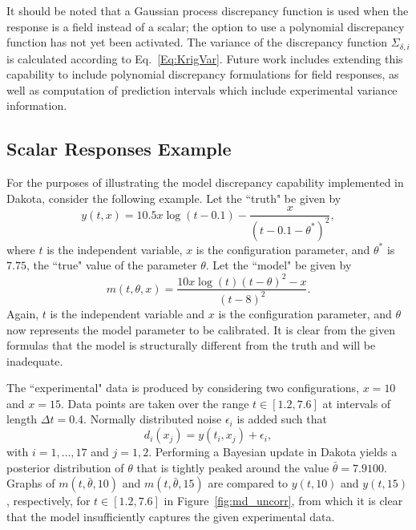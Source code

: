 It should be noted that a Gaussian process discrepancy function is used when 
the response is a field instead of a scalar; the option to use a polynomial
discrepancy function has not yet been activated. The variance of the
discrepancy function $\Sigma_{\delta, i}$ is calculated according to 
Eq.~\ref{Eq:KrigVar}. Future work includes extending this capability to 
include polynomial discrepancy formulations for field responses, as well as 
computation of prediction intervals which include experimental variance 
information.



\subsection{Scalar Responses Example}

For the purposes of illustrating the model discrepancy capability implemented
in Dakota, consider the following example. Let the ``truth" be given by
\begin{equation}\label{eq:md_truth}
y(t,x) = 10.5 x \log(t-0.1) - \frac{x}{(t-0.1-\theta^{*})^2},
\end{equation}
where $t$ is the independent variable, $x$ is the configuration parameter, and
$\theta^{*}$ is $7.75$, the ``true" value of the parameter $\theta$. Let the
``model" be given by
\begin{equation}\label{eq:md_model}
m(t,\theta, x) = \frac{10 x \log(t) (t-\theta)^2 - x}{(t-8)^2}. 
\end{equation}
Again, $t$ is the independent variable and $x$ is the configuration parameter,
and $\theta$ now represents the model parameter to be calibrated. It is clear
from the given formulas that the model is structurally different from the truth
and will be inadequate. 

The ``experimental" data is produced by considering two configurations, $x=10$
and $x=15$. Data points are taken over the range $t \in [1.2, 7.6]$ at 
intervals of length $\Delta t = 0.4$. Normally distributed noise $\epsilon_i$ 
is added such that
\begin{equation}\label{eq:md_data}
d_i(x_j) = y(t_i, x_j) + \epsilon_i,
\end{equation} 
with $i = 1, \ldots, 17$ and $j = 1,2$. Performing a 
Bayesian update in Dakota yields a posterior distribution of $\theta$ that is 
tightly peaked around the value $\bar{\theta} = 7.9100$. Graphs of 
$m(t, \bar{\theta}, 10)$ and $m(t, \bar{\theta}, 15)$ are compared to 
$y(t, 10)$ and $y(t, 15)$, respectively, for $t \in [1.2, 7.6]$ in 
Figure~\ref{fig:md_uncorr}, from which it is clear that the model insufficiently
captures the given experimental data.

